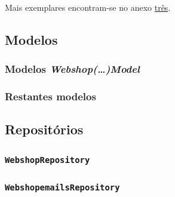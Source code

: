 Mais exemplares encontram-se no anexo \hyperref[an3]{três}.

\newpage

\subsection{Modelos}

\subsubsection*{Modelos \textit{Webshop(\ldots)Model}}

\subsubsection*{Restantes modelos}

\subsection{Repositórios}

\subsubsection*{\texttt{WebshopRepository}}

\subsubsection*{\texttt{WebshopemailsRepository}}

\newpage